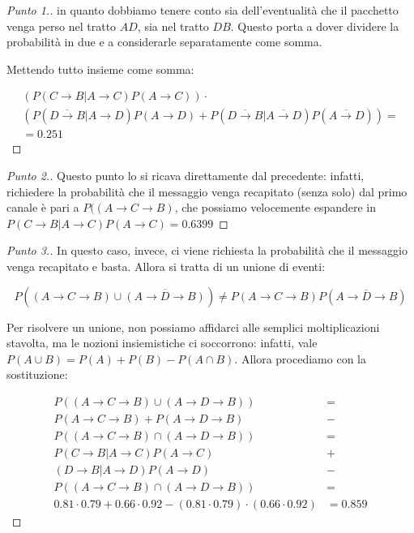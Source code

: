 \documentclass[12pt]{article}
\begin{document}
\begin{proof}[Punto 1.]
	in quanto dobbiamo tenere conto sia dell'eventualità che il pacchetto venga perso nel tratto $AD$, sia nel tratto $DB$. Questo porta a dover dividere la probabilità in due e a considerarle separatamente come somma.

	Mettendo tutto insieme come somma:

	\begin{gather*}
		\left( P(C \rightarrow B|A \rightarrow C)P(A \rightarrow C) \right) \cdot \\ 
		\left( P(\overline{D \rightarrow B}|A \rightarrow D)P(A \rightarrow D) + P(\overline{D \rightarrow B}|\overline{A \rightarrow D})P(\overline{A \rightarrow D}) \right) = \\
		 = 0.251	
	\end{gather*}
\end{proof}

\begin{proof}[Punto 2.]
	Questo punto lo si ricava direttamente dal precedente: infatti, richiedere la probabilità che il messaggio venga recapitato (senza solo) dal primo canale è pari a $P((A \rightarrow C \rightarrow B)$, che possiamo velocemente espandere in $P(C \rightarrow B|A \rightarrow C)P(A \rightarrow C) = 0.6399$
\end{proof}

\begin{proof}[Punto 3.]
	In questo caso, invece, ci viene richiesta la probabilità che il messaggio venga recapitato e basta. Allora si tratta di un unione di eventi:

	\[
		P((A \rightarrow C \rightarrow B) \cup \overline{(A \rightarrow D \rightarrow B)}) \ne P(A \rightarrow C \rightarrow B)P(\overline{A \rightarrow D \rightarrow B})
	\]

	Per risolvere un unione, non possiamo affidarci alle semplici moltiplicazioni stavolta, ma le nozioni insiemistiche ci soccorrono: infatti, vale $P(A \cup B) = P(A) + P(B) - P(A \cap B)$. Allora procediamo con la sostituzione:

	\begin{equation*}
		\begin{split}
			P((A \rightarrow C \rightarrow B) \cup (A \rightarrow D \rightarrow B)) &= \\ 
			P(A \rightarrow C \rightarrow B) + P(A \rightarrow D \rightarrow B) & - \\
			P((A \rightarrow C \rightarrow B) \cap (A \rightarrow D \rightarrow B)) &= \\
			P(C \rightarrow B|A \rightarrow C)P(A \rightarrow C) & + \\
		 	(D \rightarrow B|A \rightarrow D)P(A \rightarrow D) & - \\
		 	P((A \rightarrow C \rightarrow B) \cap (A \rightarrow D \rightarrow B)) & = \\
			 0.81 \cdot 0.79 + 0.66 \cdot 0.92 - (0.81 \cdot 0.79) \cdot (0.66 \cdot 0.92) & = 0.859
		\end{split}
	\end{equation*}
\end{proof}
\end{document}
